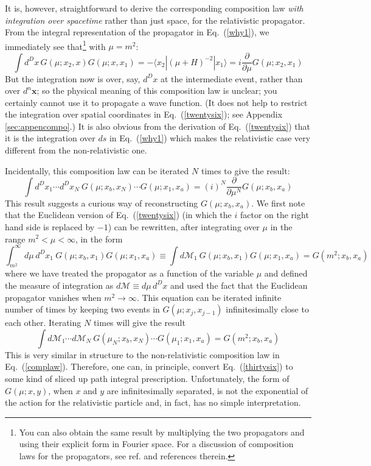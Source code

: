 \documentclass{article}
\def\eq#1{{Eq.~(\ref{#1})}}
\def\bk#1#2#3{{\langle #1|#2|#3\rangle}}  %
\begin{document}
 It is, however, straightforward to derive the corresponding composition law \textit{with integration over spacetime} rather  than just space, for the relativistic propagator. 
 From the integral representation of the propagator in \eq{why1}, we immediately see that\footnote{You can also obtain the same result by multiplying the two propagators and using their explicit form in Fourier space. For a discussion of composition laws for the propagators, see ref. \cite{B,A1} and references therein.} with $\mu=m^2$:
\begin{equation}
 \int d^Dx \, G(\mu; x_2,x) G(\mu; x,x_1) = - \bk{x_2}{(\mu +H)^{-2}}{x_1} = i \frac{\partial}{\partial \mu} G(\mu; x_2,x_1)
 \label{twentysix}
\end{equation} 
But the integration now is over, say, $d^Dx$ at the intermediate event, rather than over $d^n\bm{x}$; so the physical meaning of this composition law is unclear; you certainly cannot use it to propagate a wave function. (It does not help to restrict the integration over spatial coordinates in \eq{twentysix}; see Appendix \ref{sec:appencompo}.) It is also obvious from the derivation of \eq{twentysix} that
  it is  the integration over $ds$ in \eq{why1}  which makes the relativistic case very different from the non-relativistic one. 
 
 Incidentally, this composition law can be  iterated $N$ times to give the result:
\begin{equation}
\int d^Dx_1 \cdots d^Dx_N\ G(\mu; x_b,x_N) \cdots G(\mu; x_1,x_a) = (i)^N  \frac{\partial}{\partial \mu^N} G(\mu; x_b,x_a)
\end{equation}
This result suggests a  curious way of reconstructing $G(\mu; x_b, x_a)$. We first note that the Euclidean version of \eq{twentysix} (in which the  $i$ factor on the right hand side is replaced by $-1$) can be rewritten, after integrating over $\mu$ in the range $m^2<\mu<\infty$, in the form 
 \begin{equation}
 \int_{m^2}^\infty d\mu\, d^Dx_1\ G(\mu; x_b, x_1) G(\mu; x_1,x_a)\equiv
 \int d\mathcal{M}_1\  G(\mu; x_b,x_1) G(\mu; x_1,x_a)   = G(m^2; x_b, x_a)
 \end{equation} 
 where we have treated the propagator as a function of the variable $\mu$ and defined the measure of integration as $d\mathcal{M} \equiv d\mu\, d^Dx$ and used the fact that the Euclidean propagator vanishes when $m^2\to\infty$. This equation can be iterated infinite number of times by keeping two events in $G(\mu; x_j,x_{j-1})$ infinitesimally
  close to each other.  Iterating $N$ times will give the result
  \begin{equation}
  \int d\mathcal{M}_1 \cdots d\mathcal{M}_N \ G(\mu_N; x_b,x_N) \cdots G(\mu_1; x_1,x_a) = G(m^2; x_b,x_a)
   \label{thirtysix}
  \end{equation} 
 This is very similar in structure to the non-relativistic composition law in \eq{complaw}. Therefore, one can, in principle, convert \eq{thirtysix} to some kind of sliced up path integral prescription. Unfortunately, the form of $G(\mu; x,y)$, when $x$ and $y$ are infinitesimally separated, is not the  exponential of the action for the relativistic particle and, in fact, has no simple interpretation.
\end{document}
